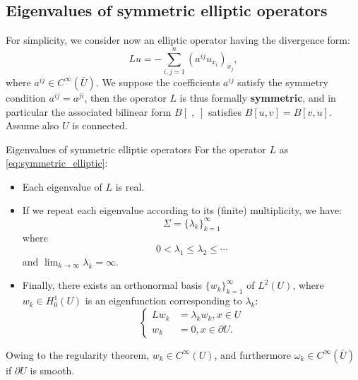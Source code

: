 \subsection{Eigenvalues of symmetric elliptic operators}
For simplicity, we consider now an elliptic operator having the divergence form:
\begin{equation}
    \label{eq:symmetric_elliptic}
    Lu=-\sum_{i,j=1}^{n}\left(a^{ij}u_{x_{i}}\right)_{x_{j}},
\end{equation}
where $a^{ij}\in C^{\infty}(\bar{U})$. We suppose the coefficients $a^{ij}$ satisfy the symmetry condition $a^{ij}=a^{ji}$, then the operator $L$ is thus formally \textbf{symmetric}, and in particular the associated bilinear form $B[\;,\;]$ satisfies $B[u,v]=B[v,u]$. Assume also $U$ is connected.
\begin{theorem}{Eigenvalues of symmetric elliptic operators}
    \label{thm:eig_val_of_sym_op}
    For the operator $L$ as \eqref{eq:symmetric_elliptic}:
    \begin{itemize}
        \item Each eigenvalue of $L$ is real.
        \item If we repeat each eigenvalue according to its (finite) multiplicity, we have:
        \begin{equation}
            \label{eq:spectrum}
            \Sigma=\{\lambda_{k}\}_{k=1}^{\infty}
        \end{equation}
        where 
        \begin{equation}
            0<\lambda_1\le\lambda_2\le\cdots
        \end{equation}
        and $\lim_{k\rightarrow\infty}\lambda_{k}=\infty$.
        \item Finally, there exists an orthonormal basis $\{w_{k}\}_{k=1}^{\infty}$ of $L^{2}(U)$, where $w_{k}\in H_{0}^{1}(U)$ is an eigenfunction corresponding to $\lambda_{k}$:
        \begin{equation}
            \left\{
                \begin{aligned}
                    Lw_{k}&=\lambda_{k}w_{k},x\in U\\
                    w_{k}&=0,x\in\partial U.
                \end{aligned}
            \right.
        \end{equation}
    \end{itemize}
\end{theorem}
\begin{remark}
    Owing to the regularity theorem, $w_{k}\in C^{\infty}(U)$, and furthermore $\omega_{k}\in C^{\infty}(\bar{U})$ if $\partial U$ is smooth.
\end{remark}
